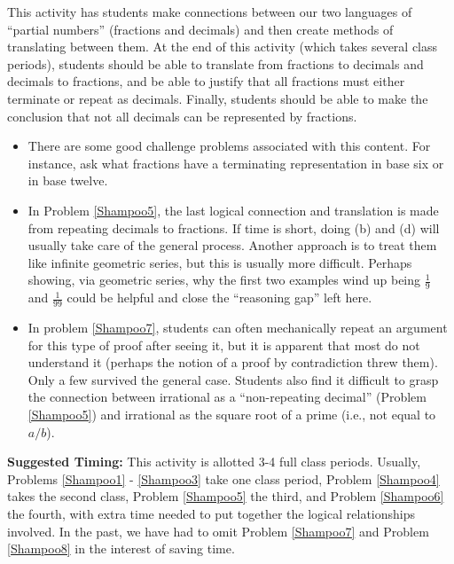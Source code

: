 \documentclass{ximera}
\begin{document}
\newpage
\begin{instructorNotes}
This activity has students make connections between our two languages of ``partial numbers'' (fractions and decimals) and then create methods of translating between them.  At the end of this activity (which takes several class periods), students should be able to translate from fractions to decimals and 
decimals to fractions, and be able to justify that all fractions must either terminate or repeat as decimals.  Finally, students should be able to make the conclusion that not all decimals can be represented by fractions.

\begin{itemize}
\item There are some good challenge problems associated with this content.  For instance, ask what fractions have a terminating representation in base six or in base twelve.
\item In Problem \ref{Shampoo5}, the last logical connection and translation is made from repeating decimals to fractions.  If time is short, doing (b) and (d) will usually take care of the general process.  Another approach is to treat them like infinite geometric series, but this is usually more difficult. Perhaps showing, via geometric series, why the first two examples wind up being $\frac19$ and $\frac{1}{99}$ could be helpful and close the ``reasoning gap'' left here.
\item In problem \ref{Shampoo7}, students can often mechanically repeat an argument for this type of proof after seeing it, but it is apparent that most do not understand it (perhaps the notion of a proof by contradiction threw them).  Only a few survived the general case.  Students also find it difficult to grasp the connection between irrational as a ``non-repeating decimal'' (Problem \ref{Shampoo5}) and irrational as the square root of a prime (i.e., not equal to $a/b$).

\end{itemize}


{\bf Suggested Timing:} This activity is allotted 3-4 full class periods.  Usually, Problems \ref{Shampoo1} - \ref{Shampoo3} take one class period, Problem \ref{Shampoo4} takes the second class, Problem \ref{Shampoo5} the third, and Problem \ref{Shampoo6} the fourth, with extra time needed to put together the logical relationships involved.  In the past, we have had to omit Problem \ref{Shampoo7} and Problem \ref{Shampoo8} in the interest of saving time.  
\end{instructorNotes}
\end{document}
